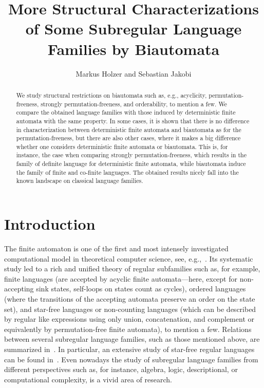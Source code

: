 \documentclass[submission]{eptcs}
\title{More Structural Characterizations of Some Subregular Language
  Families by Biautomata}
\author{Markus Holzer and Sebastian Jakobi
\institute{Institut f\"ur Informatik, Universit\"at Giessen,\\
  Arndtstr. 2, 35392 Giessen, Germany}
\email{\{holzer,sebastian.jakobi\}@informatik.uni-giessen.de}
}
\begin{document}
\maketitle

\begin{abstract}
  We study structural restrictions on biautomata such as, e.g.,
  acyclicity, permutation-freeness, strongly permutation-freeness, and
  orderability, to mention a few. We compare the obtained language
  families with those induced by deterministic finite automata with
  the same property. In some cases, it is shown that there is no
  difference in characterization between deterministic finite automata
  and biautomata as for the permutation-freeness, but there are also
  other cases, where it makes a big difference whether one considers
  deterministic finite automata or biautomata. This is, for instance,
  the case when comparing strongly permutation-freeness, which results
  in the family of definite language for deterministic finite
  automata, while biautomata induce the family of finite and co-finite
  languages. The obtained results nicely fall into the known landscape
  on classical language families.
\end{abstract}

\section{Introduction}
\label{sec:introduction}

The finite automaton is one of the first and most intensely
investigated computational model in theoretical computer science, see,
e.g.,~\cite{Mi67}. Its systematic study led to a rich and unified
theory of regular subfamilies such as, for example, finite languages
(are accepted by acyclic finite automata---here, except for
non-accepting sink states, self-loops on states count as cycles),
ordered languages (where the transitions of the accepting automata
preserve an order on the state set), and star-free languages or
non-counting languages (which can be described by regular like
expressions using only union, concatenation, and complement or
equivalently by permutation-free finite automata), to mention a
few. Relations between several subregular language families, such as
those mentioned above, are summarized in~\cite{Ha69a}. In particular,
an extensive study of star-free regular languages can be found
in~\cite{McNaPa71}. Even nowadays the study of subregular language
families from different perspectives such as, for instance, algebra,
logic, descriptional, or computational complexity, is a vivid area of
research.
\end{document}
